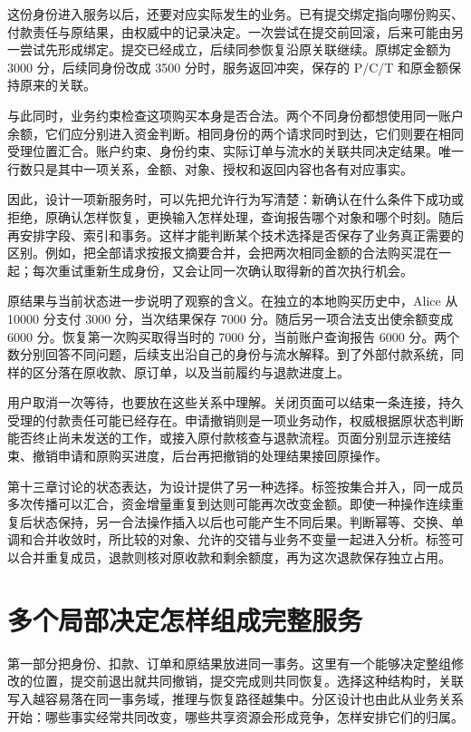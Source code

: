 这份身份进入服务以后，还要对应实际发生的业务。已有提交绑定指向哪份购买、付款责任与原结果，由权威中的记录决定。一次尝试在提交前回滚，后来可能由另一尝试先形成绑定。提交已经成立，后续同参恢复沿原关联继续。原绑定金额为 3000 分，后续同身份改成 3500 分时，服务返回冲突，保存的 P/C/T 和原金额保持原来的关联。

与此同时，业务约束检查这项购买本身是否合法。两个不同身份都想使用同一账户余额，它们应分别进入资金判断。相同身份的两个请求同时到达，它们则要在相同受理位置汇合。账户约束、身份约束、实际订单与流水的关联共同决定结果。唯一行数只是其中一项关系，金额、对象、授权和返回内容也各有对应事实。

因此，设计一项新服务时，可以先把允许行为写清楚：新确认在什么条件下成功或拒绝，原确认怎样恢复，更换输入怎样处理，查询报告哪个对象和哪个时刻。随后再安排字段、索引和事务。这样才能判断某个技术选择是否保存了业务真正需要的区别。例如，把全部请求按报文摘要合并，会把两次相同金额的合法购买混在一起；每次重试重新生成身份，又会让同一次确认取得新的首次执行机会。

原结果与当前状态进一步说明了观察的含义。在独立的本地购买历史中，Alice 从 10000 分支付 3000 分，当次结果保存 7000 分。随后另一项合法支出使余额变成 6000 分。恢复第一次购买取得当时的 7000 分，当前账户查询报告 6000 分。两个数分别回答不同问题，后续支出沿自己的身份与流水解释。到了外部付款系统，同样的区分落在原收款、原订单，以及当前履约与退款进度上。

用户取消一次等待，也要放在这些关系中理解。关闭页面可以结束一条连接，持久受理的付款责任可能已经存在。申请撤销则是一项业务动作，权威根据原状态判断能否终止尚未发送的工作，或接入原付款核查与退款流程。页面分别显示连接结束、撤销申请和原购买进度，后台再把撤销的处理结果接回原操作。

第十三章讨论的状态表达，为设计提供了另一种选择。标签按集合并入，同一成员多次传播可以汇合，资金增量重复到达则可能再次改变金额。即使一种操作连续重复后状态保持，另一合法操作插入以后也可能产生不同后果。判断幂等、交换、单调和合并收敛时，所比较的对象、允许的交错与业务不变量一起进入分析。标签可以合并重复成员，退款则核对原收款和剩余额度，再为这次退款保存独立占用。

\section*{多个局部决定怎样组成完整服务}

第一部分把身份、扣款、订单和原结果放进同一事务。这里有一个能够决定整组修改的位置，提交前退出就共同撤销，提交完成则共同恢复。选择这种结构时，关联写入越容易落在同一事务域，推理与恢复路径越集中。分区设计也由此从业务关系开始：哪些事实经常共同改变，哪些共享资源会形成竞争，怎样安排它们的归属。

